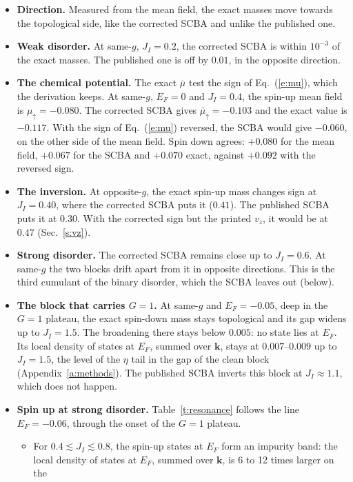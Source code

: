 \documentclass[11pt,a4paper]{article}
\newcommand{\up}{{\uparrow}}
\begin{document}
\begin{itemize}
\item \textbf{Direction.} Measured from the mean field, the exact masses move towards the
  topological side, like the corrected SCBA and unlike the published one.
\item \textbf{Weak disorder.} At same-$g$, $J_I=0.2$, the corrected SCBA is within $10^{-3}$ of
  the exact masses. The published one is off by $0.01$, in the opposite direction.
\item \textbf{The chemical potential.} The exact $\bar\mu$ test the sign of Eq.~(\ref{e:mu}),
  which the derivation keeps. At same-$g$, $E_F=0$ and $J_I=0.4$, the spin-up mean field is
  $\mu_\up=-0.080$. The corrected SCBA gives $\bar\mu_\up=-0.103$ and the exact value is $-0.117$.
  With the sign of Eq.~(\ref{e:mu}) reversed, the SCBA would give $-0.060$, on the other side of
  the mean field. Spin down agrees: $+0.080$ for the mean field, $+0.067$ for the SCBA and
  $+0.070$ exact, against $+0.092$ with the reversed sign.
\item \textbf{The inversion.} At opposite-$g$, the exact spin-up mass changes sign at
  $J_I=0.40$, where the corrected SCBA puts it ($0.41$). The published SCBA puts it at $0.30$.
  With the corrected sign but the printed $v_z$, it would be at $0.47$ (Sec.~\ref{s:vz}).
\item \textbf{Strong disorder.} The corrected SCBA remains close up to $J_I=0.6$. At same-$g$
  the two blocks drift apart from it in opposite directions. This is the third cumulant of the
  binary disorder, which the SCBA leaves out (below).
\item \textbf{The block that carries $G=1$.} At same-$g$ and $E_F=-0.05$, deep in the $G=1$
  plateau, the exact spin-down mass stays topological and its gap widens up to $J_I=1.5$. The
  broadening there stays below $0.005$: no state lies at $E_F$. Its local density of states at
  $E_F$, summed over $\bm k$, stays at $0.007$--$0.009$ up to $J_I=1.5$, the level of the $\eta$ tail
  in the gap of the clean block (Appendix~\ref{a:methods}). The published SCBA inverts this
  block at $J_I\approx1.1$, which does not happen.
\item \textbf{Spin up at strong disorder.} Table~\ref{t:resonance} follows the line
  $E_F=-0.06$, through the onset of the $G=1$ plateau.
  \begin{itemize}
  \item For $0.4\lesssim J_I\lesssim0.8$, the spin-up states at $E_F$ form an impurity band: the
    local density of states at $E_F$, summed over $\bm k$, is 6 to 12 times larger on the

\end{itemize}
\end{itemize}
\end{document}
